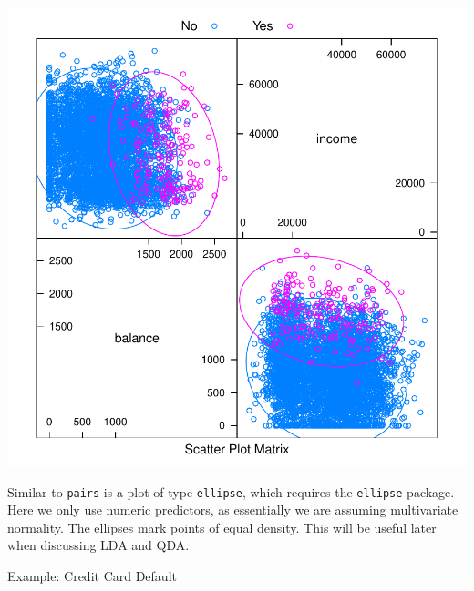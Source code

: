 \documentclass[]{report}
\newenvironment{Shaded}{\begin{snugshade}}{\end{snugshade}}
\newcommand{\KeywordTok}[1]{\textcolor[rgb]{0.13,0.29,0.53}{\textbf{#1}}}
\newcommand{\DataTypeTok}[1]{\textcolor[rgb]{0.13,0.29,0.53}{#1}}
\newcommand{\DecValTok}[1]{\textcolor[rgb]{0.00,0.00,0.81}{#1}}
\newcommand{\StringTok}[1]{\textcolor[rgb]{0.31,0.60,0.02}{#1}}
\newcommand{\OperatorTok}[1]{\textcolor[rgb]{0.81,0.36,0.00}{\textbf{#1}}}
\newcommand{\NormalTok}[1]{#1}
\begin{document}
\includegraphics{MyBook_files/figure-latex/unnamed-chunk-118-1.pdf}

Similar to \texttt{pairs} is a plot of type \texttt{ellipse}, which
requires the \texttt{ellipse} package. Here we only use numeric
predictors, as essentially we are assuming multivariate normality. The
ellipses mark points of equal density. This will be useful later when
discussing LDA and QDA.

Example: Credit Card Default

\begin{Shaded}
\end{Shaded}
\end{document}
